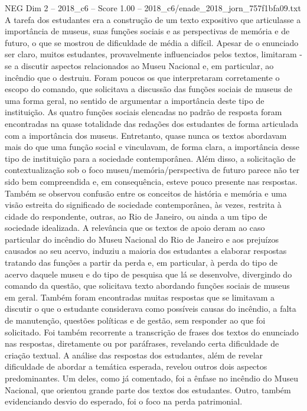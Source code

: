 \begin{textsample}{NEG Dim 2 – 2018\_c6 – Score 1.00 – 2018\_c6/enade\_2018\_jorn\_757f1bfa09.txt}
A tarefa dos estudantes era a construção de um texto expositivo que articulasse a importância de museus, suas funções sociais e as perspectivas de memória e de futuro, o que se mostrou de dificuldade de média a difícil.
Apesar de o enunciado ser claro, muitos estudantes, provavelmente influenciados pelos textos, limitaram -se a discutir aspectos relacionados ao Museu Nacional e, em particular, ao incêndio que o destruiu.
Foram poucos os que interpretaram corretamente o escopo do comando, que solicitava a discussão das funções sociais de museus de uma forma geral, no sentido de argumentar a importância deste tipo de instituição.
As quatro funções sociais elencadas no padrão de resposta foram encontradas na quase totalidade das redações dos estudantes de forma articulada com a importância dos museus.
Entretanto, quase nunca os textos abordavam mais do que uma função social e vinculavam, de forma clara, a importância desse tipo de instituição para a sociedade contemporânea.
Além disso, a solicitação de contextualização sob o foco museu/memória/perspectiva de futuro parece não ter sido bem compreendida e, em consequência, esteve pouco presente nas respostas.
Também se observou confusão entre os conceitos de história e memória e uma visão estreita do significado de sociedade contemporânea, às vezes, restrita à cidade do respondente, outras, ao Rio de Janeiro, ou ainda a um tipo de sociedade idealizada.
A relevância que os textos de apoio deram ao caso particular do incêndio do Museu Nacional do Rio de Janeiro e aos prejuízos causados ao seu acervo, induziu a maioria dos estudantes a elaborar respostas tratando das funções a partir da perda e, em particular, à perda do tipo de acervo daquele museu e do tipo de pesquisa que lá se desenvolve, divergindo do comando da questão, que solicitava texto abordando funções sociais de museus em geral.
Também foram encontradas muitas respostas que se limitavam a discutir o que o estudante considerava como possíveis causas do incêndio, a falta de manutenção, questões políticas e de gestão, sem responder ao que foi solicitado.
Foi também recorrente a transcrição de frases dos textos do enunciado nas respostas, diretamente ou por paráfrases, revelando certa dificuldade de criação textual.
A análise das respostas dos estudantes, além de revelar dificuldade de abordar a temática esperada, revelou outros dois aspectos predominantes.
Um deles, como já comentado, foi a ênfase no incêndio do Museu Nacional, que orientou grande parte dos textos dos estudantes.
Outro, também evidenciando desvio do esperado, foi o foco na perda patrimonial.

\end{textsample}
